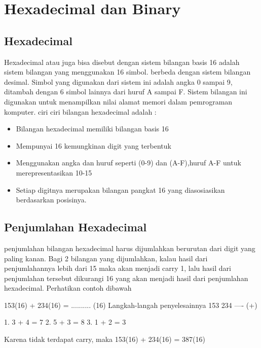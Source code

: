 \section {Hexadecimal dan Binary}
\subsection {Hexadecimal}
Hexadecimal atau juga bisa disebut dengan sistem bilangan basis 16 adalah sistem bilangan yang menggunakan 16 simbol. berbeda dengan sistem bilangan desimal. Simbol yang digunakan dari sistem ini adalah angka 0 sampai 9, ditambah dengan 6 simbol lainnya dari huruf A sampai F. Sistem bilangan ini digunakan untuk menampilkan nilai alamat memori dalam pemrograman komputer.
ciri ciri bilangan hexadecimal adalah :
\begin{itemize}
	\item Bilangan hexadecimal memiliki bilangan basis 16
	\item Mempunyai 16 kemungkinan digit yang terbentuk
	\item Menggunakan angka dan huruf seperti (0-9) dan (A-F),huruf A-F untuk merepresentasikan 10-15
	\item Setiap digitnya merupakan bilangan pangkat 16 yang diasosiasikan berdasarkan posisinya.
\end{itemize}

\subsection {Penjumlahan Hexadecimal}
penjumlahan bilangan hexadecimal harus dijumlahkan berurutan dari digit yang paling kanan. Bagi 2 bilangan yang dijumlahkan, kalau hasil dari penjumlahannya lebih dari 15 maka akan menjadi carry 1, lalu hasil dari penjumlahan tersebut dikurangi 16 yang akan menjadi hasil dari penjumlahan hexadecimal. Perhatikan contoh dibawah

153(16) + 234(16) = .......... (16) 
Langkah-langah penyelesainnya
153 
234 
---- (+)

1. 3 + 4 = 7
2. 5 + 3 = 8
3. 1 + 2 = 3

Karena tidak terdapat carry, maka 153(16) + 234(16) = 387(16)

